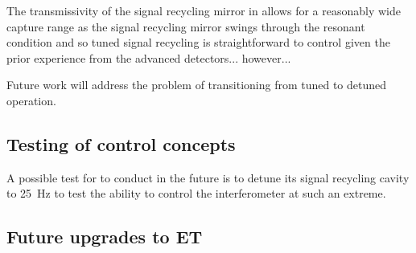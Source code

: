 The transmissivity of the signal recycling mirror in \ETLF{} allows for a reasonably wide capture range as the signal recycling mirror swings through the resonant condition and so tuned signal recycling is straightforward to control given the prior experience from the advanced detectors... however...

Future work will address the problem of transitioning \ETLF{} from tuned to detuned operation.

\subsection{Testing of control concepts}
A possible test for \GEOHF{} to conduct in the future is to detune its signal recycling cavity to \SI{25}{\hertz} to test the ability to control the interferometer at such an extreme.

\subsection{Future upgrades to ET}
